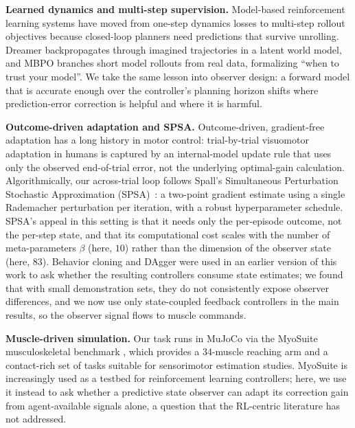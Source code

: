 \documentclass[sn-mathphys,NameDate,iicol]{sn-jnl}
\begin{document}
\smallskip

\noindent\textbf{Learned dynamics and multi-step supervision.}
Model-based reinforcement learning systems have moved from one-step
dynamics losses to multi-step rollout objectives because closed-loop
planners need predictions that survive unrolling. Dreamer
\cite{hafner2020dreamer} backpropagates through imagined trajectories
in a latent world model, and MBPO \cite{janner2019mbpo} branches
short model rollouts from real data, formalizing ``when to trust your
model''. We take the same lesson into observer design: a forward
model that is accurate enough over the controller's planning horizon
shifts where prediction-error correction is helpful and where it is
harmful.

\smallskip

\noindent\textbf{Outcome-driven adaptation and SPSA.}
Outcome-driven, gradient-free adaptation has a long history in motor
control: trial-by-trial visuomotor adaptation in humans
\cite{wolpert2000} is captured by an internal-model update rule that
uses only the observed end-of-trial error, not the underlying
optimal-gain calculation. Algorithmically, our across-trial loop
follows Spall's Simultaneous Perturbation Stochastic Approximation
(SPSA)~\cite{spall1992spsa}: a two-point gradient estimate using a
single Rademacher perturbation per iteration, with a robust
hyperparameter schedule. SPSA's appeal in this setting is that it
needs only the per-episode outcome, not the per-step state, and that
its computational cost scales with the number of meta-parameters
$\beta$ (here, $10$) rather than the dimension of the observer
state (here, $83$). Behavior cloning and DAgger
\cite{pomerleau1988alvinn, ross2011dagger} were used in an earlier
version of this work to ask whether the resulting controllers
consume state estimates; we found that with small demonstration sets,
they do not consistently expose observer differences, and we now use
only state-coupled feedback controllers in the main results, so the
observer signal flows to muscle commands.

\smallskip

\noindent\textbf{Muscle-driven simulation.}
Our task runs in MuJoCo \cite{todorov2012mujoco} via the MyoSuite
musculoskeletal benchmark \cite{caggiano2022myosuite}, which provides
a 34-muscle reaching arm and a contact-rich set of tasks suitable for
sensorimotor estimation studies. MyoSuite is increasingly used as a
testbed for reinforcement learning controllers; here, we use it instead
to ask whether a predictive state observer can adapt its
correction gain from agent-available signals alone, a question that
the RL-centric literature has not addressed.
\end{document}
